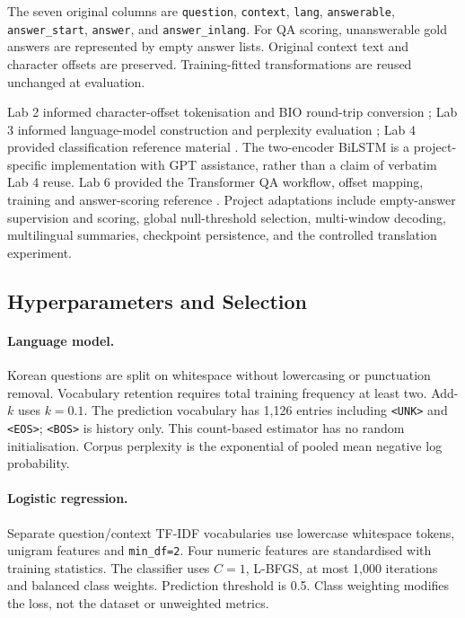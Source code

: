 \documentclass[11pt]{article}
\newcommand{\unk}{\texttt{<UNK>}}
\newcommand{\bos}{\texttt{<BOS>}}
\newcommand{\eos}{\texttt{<EOS>}}
\begin{document}
The seven original columns are \texttt{question}, \texttt{context}, \texttt{lang}, \texttt{answerable}, \texttt{answer\_start}, \texttt{answer}, and \texttt{answer\_inlang}. For QA scoring, unanswerable gold answers are represented by empty answer lists. Original context text and character offsets are preserved. Training-fitted transformations are reused unchanged at evaluation.

Lab 2 informed character-offset tokenisation and BIO round-trip conversion \citep{lab2}; Lab 3 informed language-model construction and perplexity evaluation \citep{lab3}; Lab 4 provided classification reference material \citep{lab4}. The two-encoder BiLSTM is a project-specific implementation with GPT assistance, rather than a claim of verbatim Lab 4 reuse. Lab 6 provided the Transformer QA workflow, offset mapping, training and answer-scoring reference \citep{lab6}. Project adaptations include empty-answer supervision and scoring, global null-threshold selection, multi-window decoding, multilingual summaries, checkpoint persistence, and the controlled translation experiment.

\subsection{Hyperparameters and Selection}
\paragraph{Language model.}
Korean questions are split on whitespace without lowercasing or punctuation removal. Vocabulary retention requires total training frequency at least two. Add-$k$ uses $k=0.1$. The prediction vocabulary has 1,126 entries including \unk{} and \eos{}; \bos{} is history only. This count-based estimator has no random initialisation. Corpus perplexity is the exponential of pooled mean negative log probability.

\paragraph{Logistic regression.}
Separate question/context TF-IDF vocabularies use lowercase whitespace tokens, unigram features and \texttt{min\_df=2}. Four numeric features are standardised with training statistics. The classifier uses $C=1$, L-BFGS, at most 1,000 iterations and balanced class weights. Prediction threshold is 0.5. Class weighting modifies the loss, not the dataset or unweighted metrics.
\end{document}
